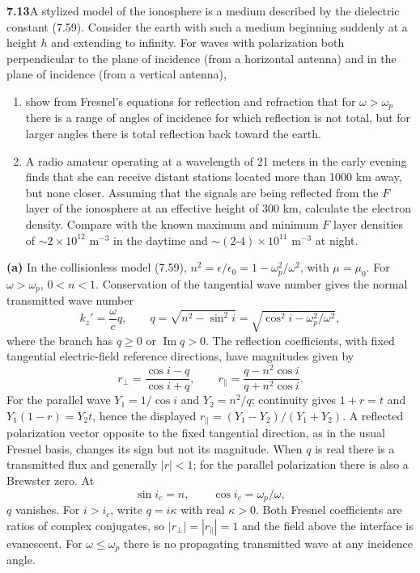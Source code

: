 \par\bigskip
\noindent\textbf{7.13}\quad A stylized model of the ionosphere is a medium described by the dielectric constant (7.59). Consider the earth with such a medium beginning suddenly at a height $h$ and extending to infinity. For waves with polarization both perpendicular to the plane of incidence (from a horizontal antenna) and in the plane of incidence (from a vertical antenna),
\begin{enumerate}
\item[(a)] show from Fresnel's equations for reflection and refraction that for $\omega>\omega_{p}$ there is a range of angles of incidence for which reflection is not total, but for larger angles there is total reflection back toward the earth.
\item[(b)] A radio amateur operating at a wavelength of 21 meters in the early evening finds that she can receive distant stations located more than 1000 km away, but none closer. Assuming that the signals are being reflected from the $F$ layer of the ionosphere at an effective height of 300 km, calculate the electron density. Compare with the known maximum and minimum $F$ layer densities of $\sim2\times10^{12}$ m$^{-3}$ in the daytime and $\sim(2\text{-}4)\times10^{11}$ m$^{-3}$ at night.
\end{enumerate}
\solution
\textbf{(a)} In the collisionless model (7.59),
$n^2=\epsilon/\epsilon_0=1-\omega_p^2/\omega^2$, with $\mu=\mu_0$.
For $\omega>\omega_p$, $0<n<1$. Conservation of the tangential
wave number gives the normal transmitted wave number
\[
k_z'=\frac\omega c q,\qquad
q=\sqrt{n^2-\sin^2i}=\sqrt{\cos^2i-\omega_p^2/\omega^2},
\]
where the branch has $q\geq0$ or $\operatorname{Im}q>0$.
The reflection coefficients, with fixed tangential electric-field
reference directions, have magnitudes given by
\[
r_\perp=\frac{\cos i-q}{\cos i+q},\qquad
r_\parallel=\frac{q-n^2\cos i}{q+n^2\cos i}.
\]
For the parallel wave $Y_1=1/\cos i$ and $Y_2=n^2/q$;
continuity gives $1+r=t$ and $Y_1(1-r)=Y_2t$, hence the displayed
$r_\parallel=(Y_1-Y_2)/(Y_1+Y_2)$.  A reflected polarization vector
opposite to the fixed tangential direction, as in the usual Fresnel
basis, changes its sign but not its magnitude. When $q$ is real there is a transmitted
flux and generally $|r|<1$; for the parallel polarization there is
also a Brewster zero. At
\[
\boxed{\sin i_c=n,\qquad \cos i_c=\omega_p/\omega,}
\]
$q$ vanishes. For $i>i_c$, write $q=i\kappa$ with real
$\kappa>0$. Both Fresnel coefficients are ratios of complex
conjugates, so $|r_\perp|=|r_\parallel|=1$ and the field above the
interface is evanescent. For $\omega\leq\omega_p$ there is no
propagating transmitted wave at any incidence angle.

